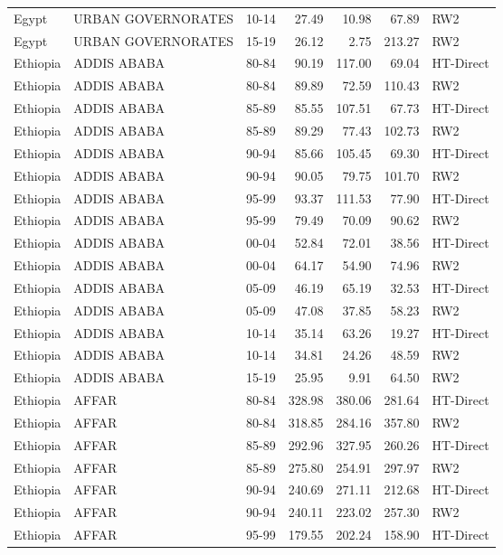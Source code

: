 \begin{longtable}{lllrrrl}
  Egypt & URBAN GOVERNORATES & 10-14 & 27.49 & 10.98 & 67.89 & RW2 \\ 
  Egypt & URBAN GOVERNORATES & 15-19 & 26.12 & 2.75 & 213.27 & RW2 \\ 
  Ethiopia & ADDIS ABABA & 80-84 & 90.19 & 117.00 & 69.04 & HT-Direct \\ 
  Ethiopia & ADDIS ABABA & 80-84 & 89.89 & 72.59 & 110.43 & RW2 \\ 
  Ethiopia & ADDIS ABABA & 85-89 & 85.55 & 107.51 & 67.73 & HT-Direct \\ 
  Ethiopia & ADDIS ABABA & 85-89 & 89.29 & 77.43 & 102.73 & RW2 \\ 
  Ethiopia & ADDIS ABABA & 90-94 & 85.66 & 105.45 & 69.30 & HT-Direct \\ 
  Ethiopia & ADDIS ABABA & 90-94 & 90.05 & 79.75 & 101.70 & RW2 \\ 
  Ethiopia & ADDIS ABABA & 95-99 & 93.37 & 111.53 & 77.90 & HT-Direct \\ 
  Ethiopia & ADDIS ABABA & 95-99 & 79.49 & 70.09 & 90.62 & RW2 \\ 
  Ethiopia & ADDIS ABABA & 00-04 & 52.84 & 72.01 & 38.56 & HT-Direct \\ 
  Ethiopia & ADDIS ABABA & 00-04 & 64.17 & 54.90 & 74.96 & RW2 \\ 
  Ethiopia & ADDIS ABABA & 05-09 & 46.19 & 65.19 & 32.53 & HT-Direct \\ 
  Ethiopia & ADDIS ABABA & 05-09 & 47.08 & 37.85 & 58.23 & RW2 \\ 
  Ethiopia & ADDIS ABABA & 10-14 & 35.14 & 63.26 & 19.27 & HT-Direct \\ 
  Ethiopia & ADDIS ABABA & 10-14 & 34.81 & 24.26 & 48.59 & RW2 \\ 
  Ethiopia & ADDIS ABABA & 15-19 & 25.95 & 9.91 & 64.50 & RW2 \\ 
  Ethiopia & AFFAR & 80-84 & 328.98 & 380.06 & 281.64 & HT-Direct \\ 
  Ethiopia & AFFAR & 80-84 & 318.85 & 284.16 & 357.80 & RW2 \\ 
  Ethiopia & AFFAR & 85-89 & 292.96 & 327.95 & 260.26 & HT-Direct \\ 
  Ethiopia & AFFAR & 85-89 & 275.80 & 254.91 & 297.97 & RW2 \\ 
  Ethiopia & AFFAR & 90-94 & 240.69 & 271.11 & 212.68 & HT-Direct \\ 
  Ethiopia & AFFAR & 90-94 & 240.11 & 223.02 & 257.30 & RW2 \\ 
  Ethiopia & AFFAR & 95-99 & 179.55 & 202.24 & 158.90 & HT-Direct \\ 

\end{longtable}
